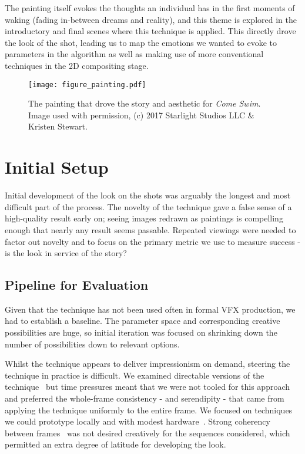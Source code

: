\documentclass{acmsiggraph}
\begin{document}
The painting itself evokes the thoughts an individual has in the first moments of waking (fading in-between dreams and reality), and this theme is explored in the introductory and final scenes where this technique is applied. This directly drove the look of the shot, leading us to map the emotions we wanted to evoke to parameters in the algorithm as well as making use of more conventional techniques in the 2D compositing stage.

\begin{figure}[ht]
  \centering
  \texttt{[image: figure\_painting.pdf]}
  \caption{The painting that drove the story and aesthetic for \textit{Come Swim}. Image used with permission, (c) 2017 Starlight Studios LLC \& Kristen Stewart.}
  \label{fig:painting}
\end{figure}

\section{Initial Setup}
Initial development of the look on the shots was arguably the longest and most difficult part of the process. The novelty of the technique gave a false sense of a high-quality result early on; seeing images redrawn as paintings is compelling enough that nearly any result seems passable. Repeated viewings were needed to factor out novelty and to focus on the primary metric we use to measure success - is the look in service of the story?

\subsection{Pipeline for Evaluation}
Given that the technique has not been used often in formal VFX production, we had to establish a baseline. The parameter space and corresponding creative possibilities are huge, so initial iteration was focused on shrinking down the number of possibilities down to relevant options.

Whilst the technique appears to deliver impressionism on demand, steering the technique in practice is difficult. We examined directable versions of the technique~\cite{ulyanov:2016} but time pressures meant that we were not tooled for this approach and preferred the whole-frame consistency - and serendipity - that came from applying the technique uniformly to the entire frame. We focused on techniques we could prototype locally and with modest hardware~\cite{liu:2016}. Strong coherency between frames~\cite{ruder:2016} was not desired creatively for the sequences considered, which permitted an extra degree of latitude for developing the look.
\end{document}
